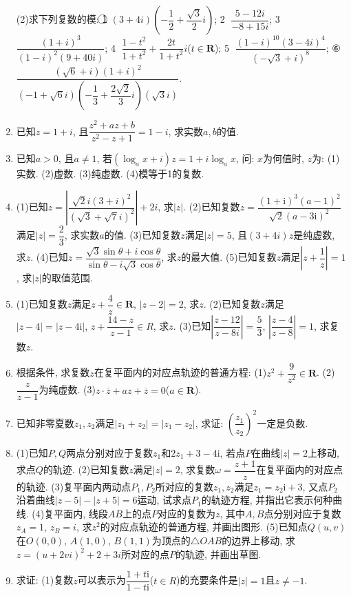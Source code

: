 \documentclass[10pt,a4paper]{article}
\begin{document}
\begin{enumerate}[1.]
(2)求下列复数的模:
\textcircled{1} $(3+4i)(-\dfrac 12+\dfrac{\sqrt 3}2i)$; 					\textcircled{2} $\dfrac{5-12i}{-8+15i}$;
\textcircled{3} $\dfrac{{{(1+i)}^3}}{{{(1-i)}^2}(9+40i)}$; 						\textcircled{4} $\dfrac{1-{t^2}}{1+{t^2}}+\dfrac{2t}{1+{t^2}}i$($t\in \mathbf{R}$);
\textcircled{5} $\dfrac{{{(1-i)}^{10}}{{(3-4i)}^4}}{{{(-\sqrt 3+i)}^8}}$; 						⑥$\dfrac{(\sqrt 6+i){{(1+i)}^2}}{(-1+\sqrt 6i)(-\dfrac 13+\dfrac{2\sqrt 2}3i)(\sqrt 3i)}$.
\item 已知$z=1+i$, 且$\dfrac{{z^2}+az+b}{{z^2}-z+1}=1-i$, 求实数$a,b$的值.
\item 已知$a>0$, 且$a\ne 1$, 若$(\log _ax+i)z=1+i\log _ax$, 问: $x$为何值时, $z$为:
(1)实数.		(2)虚数.			(3)纯虚数.			(4)模等于1的复数.
\item (1)已知$z=|\dfrac{\sqrt 2i{{(3+i)}^2}}{{{(\sqrt 3+\sqrt 7i)}^2}}|+2i$, 求$|z|$.
(2)已知复数$z=\dfrac{{{(1+\mathrm{i})}^3}{{(a-1)}^2}}{\sqrt 2{{(a-3\mathrm{i})}^2}}$满足$|z|=\dfrac 23$, 求实数$a$的值.
(3)已知复数$z$满足$|z|=5$, 且$(3+4i)z$是纯虚数, 求$z$.
(4)已知$z=\dfrac{\sqrt 3\sin \theta +i\cos \theta }{\sin \theta -i\sqrt 3\cos \theta }$, 求$z$的最大值.
(5)已知复数$z$满足$|z+\dfrac 1z|=1$, 求$|z|$的取值范围.
\item (1)已知复数$z$满足$z+\dfrac 4z\in \mathbf{R}$, $|z-2|=2$, 求$z$.
(2)已知复数$z$满足$|z-4|=|z-4\mathrm{i}|$, $z+\dfrac{14-z}{z-1}\in R$, 求$z$.
(3)已知$|\dfrac{z-12}{z-8i}|=\dfrac 53$, $|\dfrac{z-4}{z-8}|=1$, 求复数$z$.
\item 根据条件, 求复数$z$在复平面内的对应点轨迹的普通方程:
(1)$z^2+\dfrac 9{z^2}\in \mathbf{R}$.	(2)$\dfrac z{z-1}$为纯虚数.		(3)$z\cdot \overline z+az+\overline z=0$($a\in \mathbf{R}$).
\item 已知非零夏数$z_1,z_2$满足$|z_1+z_2|=|z_1-z_2|$, 求证: $(\dfrac{z_1}{z_2})^2$一定是负数.
\item (1)已知$P,Q$两点分别对应于复数$z_1$和$2z_1+3-4\mathrm{i}$, 若点$P$在曲线$|z|=2$上移动, 求点$Q$的轨迹.
(2)已知复数$z$满足$|z|=2$, 求复数$\omega =\dfrac{z+1}z$在复平面内的对应点的轨迹.
(3)复平面内两动点$P_1,P_2$所对应的复数$z_1,z_2$满足$z_1=z_2\mathrm{i}+3$, 又点$P_2$沿着曲线$|z-5|-|z+5|=6$运动, 试求点$P_1$的轨迹方程, 并指出它表示何种曲线.
(4)复平面内, 线段$AB$上的点$P$对应的复数为$z$, 其中$A,B$点分别对应于复数$z_A=1$, $z_B=i$, 求$z^2$的对应点轨迹的普通方程, 并画出图形.
(5)已知点$Q(u,v)$在$O(0,0)$, $A(1,0)$, $B(1,1)$为顶点的$\triangle OAB$的边界上移动, 求$z=(u+2vi)^2+2+3i$所对应的点$P$的轨迹, 并画出草图.
\item 求证:
(1)复数$z$可以表示为$\dfrac{1+t\mathrm{i}}{1-t\mathrm{i}}$($t\in R$)的充要条件是$|z|=1$且$z\ne -1$.

\end{enumerate}
\end{document}

